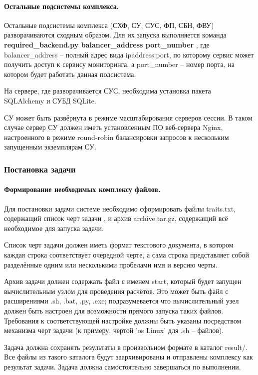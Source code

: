 \documentclass[a4paper,12pt]{report}
\numberwithin{equation}{section}
\begin{document}
  \paragraph{Остальные подсистемы комплекса.}
  Остальные подсистемы комплекса (СХФ, СУ, СУС, ФП, СБН, ФВУ) разворачиваются сходным образом.
  Для их запуска выполняется команда 
  \textbf{ required\_backend.py balancer\_address port\_number }
  , где balancer\_address -- полный адрес вида ipaddress:port, по которому сервис может получить доступ к сервису мониторинга,
  а port\_number -- номер порта, на котором будет работать данная подсистема.
  
  На сервере, где разворачивается СУС, необходима установка пакета \\ SQLAlchemy и СУБД SQLite.
  
  СУ может быть развёрнута в режиме масштабирования серверов сессии. 
  В таком случае сервер СУ должен иметь установленным ПО веб-сервера Nginx, настроенного в режиме round-robin балансировки запросов к нескольким запущенным экземплярам СУ.
  
  \subsubsection{Постановка задачи}
  \paragraph{Формирование необходимых комплексу файлов.}
  Для постановки задачи системе необходимо сформировать файлы traits.txt, содержащий список черт задачи
  , и архив archive.tar.gz, содержащий всё необходимое для запуска задачи.
  
  Список черт задачи должен иметь формат текстового документа, в котором каждая строка
  соответствует очередной черте, а сама строка представляет собой разделённые одним или несколькими пробелами имя и версию черты.
  
  Архив задачи должен содержать файл с именем start, который будет запущен вычислительным узлом для проведения расчётов.
  Это может быть файл с расширениями .sh, .bat, .py, .exe; подразумевается что вычислительный узел должен быть настроен для возможности прямого запуска таких файлов.
  Требования к соответствующей настройке должны быть указаны посредством механизма черт задачи (к примеру, чертой 'os Linux' для .sh -- файлов).
  
  Задача должна сохранять результаты в произвольном формате в каталог result/. 
  Все файлы из такого каталога будут заархивированы и отправлены комплексу как результат задачи.
  Задача должна самостоятельно завершаться по выполнении.
  
\end{document}
